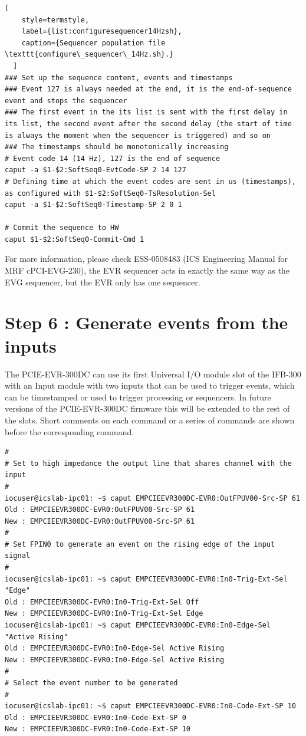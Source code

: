 \documentclass[11pt
  , a4paper
  , article
  , oneside
  , showtrims
]{memoir}
\begin{document}
{\begin{lstlisting}[
    style=termstyle,
    label={list:configuresequencer14Hzsh},
    caption={Sequencer population file \texttt{configure\_sequencer\_14Hz.sh}.}
  ]
### Set up the sequence content, events and timestamps
### Event 127 is always needed at the end, it is the end-of-sequence event and stops the sequencer
### The first event in the its list is sent with the first delay in its list, the second event after the second delay (the start of time is always the moment when the sequencer is triggered) and so on
### The timestamps should be monotonically increasing
# Event code 14 (14 Hz), 127 is the end of sequence
caput -a $1-$2:SoftSeq0-EvtCode-SP 2 14 127
# Defining time at which the event codes are sent in us (timestamps), as configured with $1-$2:SoftSeq0-TsResolution-Sel
caput -a $1-$2:SoftSeq0-Timestamp-SP 2 0 1

# Commit the sequence to HW
caput $1-$2:SoftSeq0-Commit-Cmd 1
\end{lstlisting}
For more information, please check ESS-0508483 (ICS Engineering Manual for MRF cPCI-EVG-230), the EVR sequencer acts in exactly the same way as the EVG sequencer, but the EVR only has one sequencer.


\section{Step 6 : Generate events from the inputs}
The PCIE-EVR-300DC can use its first Universal I/O module slot of the IFB-300 with an Input module with two inputs that can be used to trigger events, which can be timestamped or used to trigger processing or sequencers. In future versions of the PCIE-EVR-300DC firmware this will be extended to the rest of the slots. Short comments on each command or a series of commands are shown before the corresponding command.
\begin{lstlisting}[style=termstyle]
#
# Set to high impedance the output line that shares channel with the input
#
iocuser@icslab-ipc01: ~$ caput EMPCIEEVR300DC-EVR0:OutFPUV00-Src-SP 61
Old : EMPCIEEVR300DC-EVR0:OutFPUV00-Src-SP 61
New : EMPCIEEVR300DC-EVR0:OutFPUV00-Src-SP 61
#
# Set FPIN0 to generate an event on the rising edge of the input signal
#
iocuser@icslab-ipc01: ~$ caput EMPCIEEVR300DC-EVR0:In0-Trig-Ext-Sel "Edge"
Old : EMPCIEEVR300DC-EVR0:In0-Trig-Ext-Sel Off
New : EMPCIEEVR300DC-EVR0:In0-Trig-Ext-Sel Edge
iocuser@icslab-ipc01: ~$ caput EMPCIEEVR300DC-EVR0:In0-Edge-Sel "Active Rising"
Old : EMPCIEEVR300DC-EVR0:In0-Edge-Sel Active Rising
New : EMPCIEEVR300DC-EVR0:In0-Edge-Sel Active Rising
#
# Select the event number to be generated
#
iocuser@icslab-ipc01: ~$ caput EMPCIEEVR300DC-EVR0:In0-Code-Ext-SP 10
Old : EMPCIEEVR300DC-EVR0:In0-Code-Ext-SP 0
New : EMPCIEEVR300DC-EVR0:In0-Code-Ext-SP 10
\end{lstlisting}



}
\end{document}
